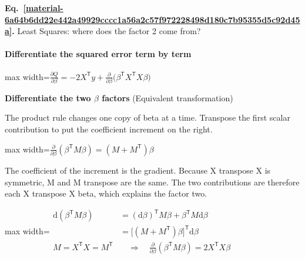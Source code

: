 \documentclass[11pt,a4paper]{article}
\begin{document}
\par\medskip
{}
\label{material-6a64b6dd22e442a49929cccc1a56a2c57f972228498d180c7b95355d5c92d45a}
\noindent\textbf{Eq.~\ref*{material-6a64b6dd22e442a49929cccc1a56a2c57f972228498d180c7b95355d5c92d45a}.} Least Squares: where does the factor 2 come from?\par\nopagebreak
\paragraph{Differentiate the squared error term by term}
\begin{center}\begin{adjustbox}{max width=\linewidth}$\displaystyle \frac{\partial Q}{\partial\beta}=-2X^{\mathsf T}y+\frac{\partial}{\partial\beta}\bigl(\beta^{\mathsf T}X^{\mathsf T}X\beta\bigr)$\end{adjustbox}\end{center}
\noindent\textbf{Differentiate the two \ensuremath{\beta} factors} (Equivalent transformation)\par
The product rule changes one copy of beta at a time. Transpose the first scalar contribution to put the coefficient increment on the right.
\begin{center}\begin{adjustbox}{max width=\linewidth}$\displaystyle \frac{\partial}{\partial\beta}(\beta^{\mathsf T}M\beta)=(M+M^{\mathsf T})\beta$\end{adjustbox}\end{center}

The coefficient of the increment is the gradient. Because X transpose X is symmetric, M and M transpose are the same. The two contributions are therefore each X transpose X beta, which explains the factor two.
\begin{center}\begin{adjustbox}{max width=\linewidth}$\displaystyle \begin{aligned}\mathrm d(\beta^{\mathsf T}M\beta)&=(\mathrm d\beta)^{\mathsf T}M\beta+\beta^{\mathsf T}M\mathrm d\beta\\&=\bigl[(M+M^{\mathsf T})\beta\bigr]^{\mathsf T}\mathrm d\beta\\[.45em]M=X^{\mathsf T}X=M^{\mathsf T}&\quad\Longrightarrow\quad \frac{\partial}{\partial\beta}(\beta^{\mathsf T}M\beta)=2X^{\mathsf T}X\beta\end{aligned}$\end{adjustbox}\end{center}
\end{document}
